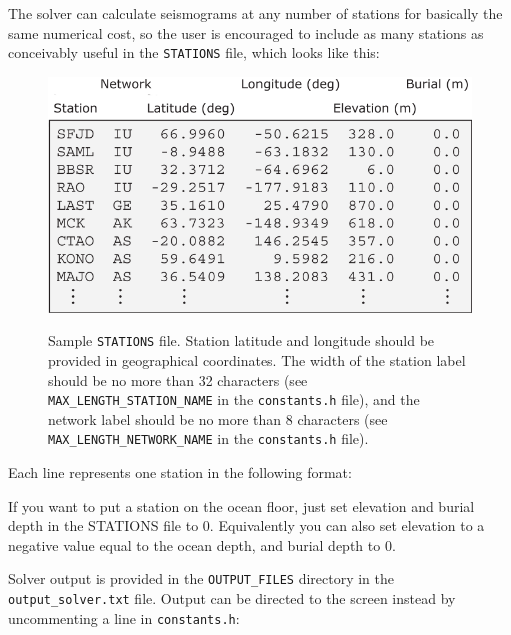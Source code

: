 \documentclass[oneside,english]{book}
\newenvironment{lyxcode}
{\begin{list}{}{
\setlength{\rightmargin}{\leftmargin}
\setlength{\listparindent}{0pt}%
\raggedright
\setlength{\itemsep}{0pt}
\setlength{\parsep}{0pt}
\normalfont\ttfamily}%
 \item[]}
{\end{list}}
\begin{document}
The solver can calculate seismograms at any number of stations for
basically the same numerical cost, so the user is encouraged to include
as many stations as conceivably useful in the \texttt{STATIONS} file,
which looks like this:

{\small }%
\begin{figure}[H]
\noindent \begin{centering}
{\small \includegraphics{figures/STATIONS_global_explained} }
\par\end{centering}{\small \par}

\caption{Sample \texttt{STATIONS} file. Station latitude and longitude should
be provided in geographical coordinates. The width of the station
label should be no more than 32 characters (see \texttt{MAX\_LENGTH\_STATION\_NAME}
in the \texttt{constants.h} file), and the network label should be
no more than 8 characters (see \texttt{MAX\_LENGTH\_NETWORK\_NAME}
in the \texttt{constants.h} file).}

\end{figure}
{\small \par}

Each line represents one station in the following format:

\begin{lyxcode}
\end{lyxcode}
If you want to put a station on the ocean floor, just set
elevation and burial depth in the STATIONS file to 0.
Equivalently you can also set elevation to a negative value equal
to the ocean depth, and burial depth to 0.

Solver output is provided in the \texttt{OUTPUT\_FILES} directory
in the \texttt{output\_solver.txt} file. Output can be directed to
the screen instead by uncommenting a line in \texttt{constants.h}:
\end{document}
